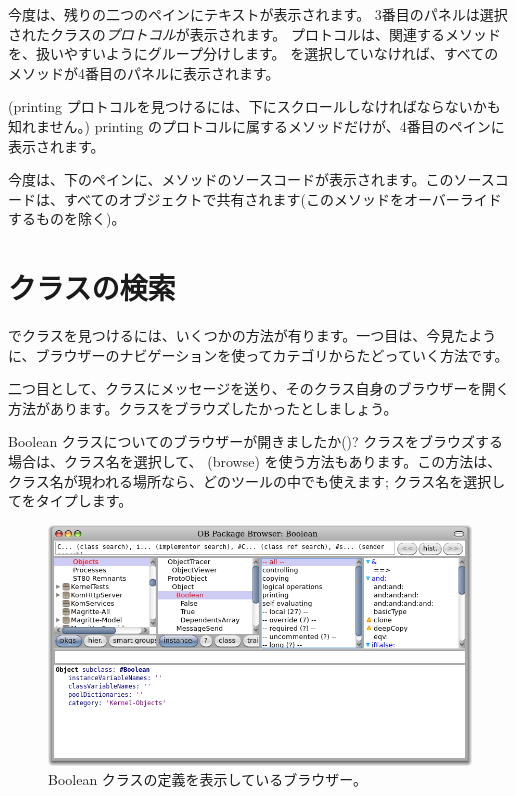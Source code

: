 \documentclass[a4paper,10pt,twoside]{book}
\begin{document}
今度は、残りの二つのペインにテキストが表示されます。
3番目のパネルは選択されたクラスの\emph{プロトコル}が表示されます。
プロトコルは、関連するメソッドを、扱いやすいようにグループ分けします。
を選択していなければ、すべてのメソッドが4番目のパネルに表示されます。

(printing プロトコルを見つけるには、下にスクロールしなければならないかも知れません。)
printing のプロトコルに属するメソッドだけが、4番目のペインに表示されます。

今度は、下のペインに、メソッドのソースコードが表示されます。このソースコードは、すべてのオブジェクトで共有されます(このメソッドをオーバーライドするものを除く)。

\section{クラスの検索}

\pharo でクラスを見つけるには、いくつかの方法が有ります。一つ目は、今見たように、ブラウザーのナビゲーションを使ってカテゴリからたどっていく方法です。

二つ目として、クラスにメッセージを送り、そのクラス自身のブラウザーを開く方法があります。クラスをブラウズしたかったとしましょう。

Boolean クラスについてのブラウザーが開きましたか()?
クラスをブラウズする場合は、クラス名を選択して、  (browse) を使う方法もあります。この方法は、クラス名が現われる場所なら、どのツールの中でも使えます;
クラス名を選択してをタイプします。


\begin{figure}[hbt]
\centerline {\includegraphics[width=\textwidth]{Kernel-objects-boolean}}
\caption{Boolean クラスの定義を表示しているブラウザー。
}
\end{figure}
\end{document}
